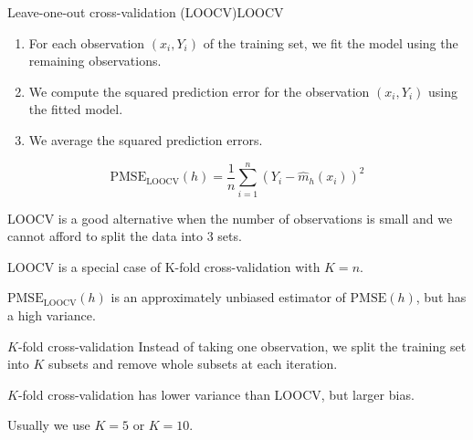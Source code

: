\begin{definition}{Leave-one-out cross-validation (LOOCV)}{LOOCV}
    \begin{enumerate}
        \item For each observation $(x_i, Y_i)$ of the training set, we fit the model
        using the remaining observations.
        \item We compute the squared prediction error for the observation $(x_i, Y_i)$
        using the fitted model.
        \item We average the squared prediction errors.
    \end{enumerate}
    \begin{equation*}
        \text{PMSE}_\text{LOOCV}(h) = \frac{1}{n} \sum_{i=1}^n \left( Y_i - \hat m_h(x_i) \right)^2
    \end{equation*}
    \tcblower
    \begin{note}
        LOOCV is a good alternative when the number of observations is small and we cannot
        afford to split the data into 3 sets.
    \end{note}
    \begin{note}
        LOOCV is a special case of K-fold cross-validation with $K=n$.
    \end{note}
    \begin{note}
        $\text{PMSE}_\text{LOOCV}(h)$ is an approximately unbiased estimator of $\text{PMSE}(h)$,
        but has a high variance.
    \end{note}
\end{definition}

\begin{definition}{$K$-fold cross-validation}{}
Instead of taking one observation, we split the training set into $K$ subsets
and remove whole subsets at each iteration.

\tcblower
\begin{note}
    $K$-fold cross-validation has lower variance than LOOCV, but larger bias.
\end{note}
Usually we use $K=5$ or $K=10$.
\end{definition}

